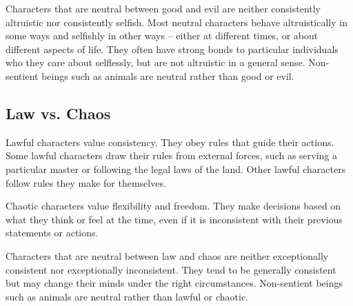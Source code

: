         Characters that are neutral between good and evil are neither consistently altruistic nor consistently selfish.
        Most neutral characters behave altruistically in some ways and selfishly in other ways -- either at different times, or about different aspects of life.
        They often have strong bonds to particular individuals who they care about selflessly, but are not altruistic in a general sense.
        Non-sentient beings such as animals are neutral rather than good or evil.

    \subsection{Law vs. Chaos}
         Lawful characters value consistency.
        They obey rules that guide their actions.
        Some lawful characters draw their rules from external forces, such as serving a particular master or following the legal laws of the land.
        Other lawful characters follow rules they make for themselves.

         Chaotic characters value flexibility and freedom.
        They make decisions based on what they think or feel at the time, even if it is inconsistent with their previous statements or actions.

         Characters that are neutral between law and chaos are neither exceptionally consistent nor exceptionally inconsistent.
        They tend to be generally consistent but may change their minds under the right circumstances.
        Non-sentient beings such as animals are neutral rather than lawful or chaotic.

